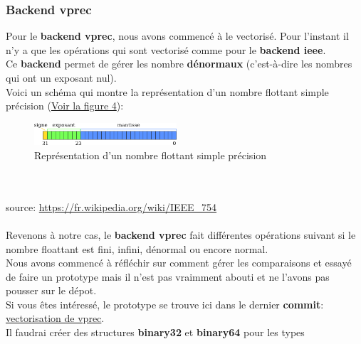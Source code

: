 \documentclass[11pt]{article}
\begin{document}
\subsubsection{Backend vprec}
\label{sec:org9bc18dc}

Pour le \textbf{backend vprec}, nous avons commencé à le vectorisé. Pour l'instant
il n'y a que les opérations qui sont vectorisé comme pour le \textbf{backend ieee}.
\\ \vspace{5mm}
Ce \textbf{backend} permet de gérer les nombre \textbf{dénormaux} (c'est-à-dire les
nombres qui ont un exposant nul).
\\ \vspace{5mm}
Voici un schéma qui montre la représentation d'un nombre flottant simple
précision (\hyperref[fig:orgb3c7269]{Voir la figure 4}):
\\ \vspace{5mm}
\begin{figure}[htbp]
\centering
\includegraphics[width=200px]{../ressources/IEEE754_simple_precision.png}
\caption{\label{fig:orgb3c7269}Représentation d'un nombre flottant simple précision}
\end{figure}\\
\\ \vspace{5mm}
source: \url{https://fr.wikipedia.org/wiki/IEEE\_754}\\
\\ \vspace{5mm}
Revenons à notre cas, le \textbf{backend vprec} fait différentes opérations suivant
si le nombre floattant est fini, infini, dénormal ou encore normal.
\\ \vspace{5mm}
Nous avons commencé à réfléchir sur comment gérer les comparaisons et essayé
de faire un prototype mais il n'est pas vraimment abouti et ne l'avons pas
pousser sur le dépot.
\\ \vspace{5mm}
Si vous êtes intéressé, le prototype se trouve ici dans le dernier \textbf{commit}:
\href{https://github.com/Safecarlo/verificarlo/tree/vectorize-vprec}{vectorisation de vprec}.
\\ \vspace{5mm}
Il faudrai créer des structures \textbf{binary32} et \textbf{binary64} pour les types
\end{document}
